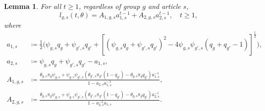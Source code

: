 \documentclass[letterpaper]{article} %
\newtheorem{lemma}{Lemma}
\begin{document}
\begin{lemma}\label{lemma:closed_form_Z_transform_old}
For all $t\geq 1$, regardless of group $g$ and article $s$, 
\begin{equation}
    l_{g,s}(t,\theta) = 
    A_{1,g,s}a_{1,s}^{t-1} + A_{2,g,s}a_{2,s}^{t-1}, \quad  t\geq 1,
\end{equation}
where
\begin{align*}
    a_{1,s} &\coloneqq \frac{1}{2} \big( \psi_{g,s}q_g + \psi_{g',s}q_{g'} + \left[ (\psi_{g,s}q_g + \psi_{g',s}q_{g'})^2 - 4 \psi_{g,s}\psi_{g',s}(q_g + q_{g'} -1) \right]^{\frac{1}{2}} \big), \\
    a_{2,s} &\coloneqq \psi_{g,s}q_g + \psi_{g',s}q_{g'} - a_{1,s},\\
    A_{1,g,s} &\coloneqq \frac{\theta_{g,s} \pi_g \psi_{g,s} + \psi_{g,s}\psi_{g',s}\left(\theta_{g',s} \pi_{g'} (1-q_{g'}) - \theta_{g,s} \pi_g q_{g'}\right)a_{1,s}^{-1}}{1-a_{2,s}a_{1,s}^{-1}}, \\
    A_{2,g,s} &\coloneqq \frac{\theta_{g,s} \pi_g \psi_{g,s} + \psi_{g,s}\psi_{g',s}\left(\theta_{g',s} \pi_{g'} (1-q_{g'}) - \theta_{g,s} \pi_g q_{g'}\right)a_{2,s}^{-1}}{1-a_{2,s}^{-1}a_{1,s}}. 
\end{align*}
\end{lemma}
\end{document}

